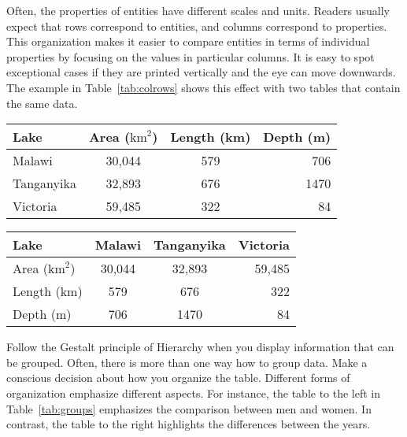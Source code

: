 Often, the properties of entities have different scales and units. Readers usually expect that rows correspond to entities, and columns correspond to properties. This organization makes it easier to compare entities in terms of individual properties by focusing on the values in particular columns. It is easy to spot exceptional cases if they are printed vertically and the eye can move downwards. The example in Table~\ref{tab:colrows} shows this effect with two tables that contain the same data.

\begin{table*}[tb]
  \caption{\label{tab:colrows} The table to the left is easier to read than the table to the right (reproduced from \cite{Carter12} with permission).}
  \centering
  \footnotesize %
  {\renewcommand{\arraystretch}{1.1} %
  \begin{tabularx}{0.45\linewidth}{@{}Xccr@{}} %
    \toprule
    Lake & Area ($\mathrm{km}^2$) & Length (km) & Depth (m)\\
    \midrule
    Malawi & 30,044 & 579 & 706 \\
    Tanganyika & 32,893 & 676 & 1470 \\
    Victoria & 59,485 & 322 & 84\\
    \bottomrule
  \end{tabularx}
  \hspace{\fill}
  \begin{tabularx}{0.45\linewidth}{@{}Xccr@{}} %
    \toprule
    Lake & Malawi & Tanganyika & Victoria\\
    \midrule
    Area ($\mathrm{km}^2$) & 30,044 & 32,893 & 59,485 \\
    Length (km) & 579 & 676 & 322 \\
    Depth (m) & 706 & 1470 & 84\\
    \bottomrule
  \end{tabularx}
  }
\end{table*}

Follow the Gestalt principle of Hierarchy when you display information that can be grouped. Often, there is more than one way how to group data. Make a conscious decision about how you organize the table. Different forms of organization emphasize different aspects. For instance, the table to the left in Table~\ref{tab:groups} emphasizes the comparison between men and women. In contrast, the table to the right highlights the differences between the years.

